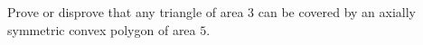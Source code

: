 \problem
Prove or disprove that any triangle of area $3$ can be covered by an axially
symmetric convex polygon of area $5$.
\solution
\endproblem
